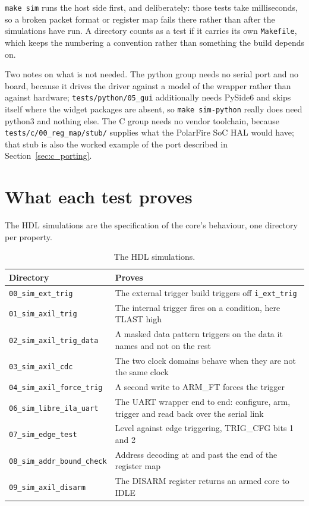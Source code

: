 \documentclass[../manual.tex]{subfiles}
\begin{document}
\texttt{make sim} runs the host side first, and deliberately: those tests take milliseconds, so a broken packet format or register map fails there rather than after the simulations have run. A directory counts as a test if it carries its own \texttt{Makefile}, which keeps the numbering a convention rather than something the build depends on.

Two notes on what is not needed. The python group needs no serial port and no board, because it drives the driver against a model of the wrapper rather than against hardware; \texttt{tests/python/05\_gui} additionally needs PySide6 and skips itself where the widget packages are absent, so \texttt{make sim-python} really does need python3 and nothing else. The C group needs no vendor toolchain, because \texttt{tests/c/00\_reg\_map/stub/} supplies what the PolarFire SoC HAL would have; that stub is also the worked example of the port described in Section~\ref{sec:c_porting}.

\section{What each test proves}
\label{sec:nohw_coverage}

The HDL simulations are the specification of the core's behaviour, one directory per property.

\begin{table}[H]
    \centering
    \begin{tabularx}{\textwidth}{|l|X|}
        \hline
        \rowcolor{gray!40} \textbf{Directory} & \textbf{Proves} \\
        \hline
        \texttt{00\_sim\_ext\_trig} & The external trigger build triggers off \texttt{i\_ext\_trig} \\
        \hline
        \texttt{01\_sim\_axil\_trig} & The internal trigger fires on a condition, here TLAST high \\
        \hline
        \texttt{02\_sim\_axil\_trig\_data} & A masked data pattern triggers on the data it names and not on the rest \\
        \hline
        \texttt{03\_sim\_axil\_cdc} & The two clock domains behave when they are not the same clock \\
        \hline
        \texttt{04\_sim\_axil\_force\_trig} & A second write to ARM\_FT forces the trigger \\
        \hline
        \texttt{06\_sim\_libre\_ila\_uart} & The UART wrapper end to end: configure, arm, trigger and read back over the serial link \\
        \hline
        \texttt{07\_sim\_edge\_test} & Level against edge triggering, TRIG\_CFG bits 1 and 2 \\
        \hline
        \texttt{08\_sim\_addr\_bound\_check} & Address decoding at and past the end of the register map \\
        \hline
        \texttt{09\_sim\_axil\_disarm} & The DISARM register returns an armed core to IDLE \\
        \hline
    \end{tabularx}
    \caption{The HDL simulations.}
    \label{tab:nohw_hdl}
\end{table}
\end{document}
